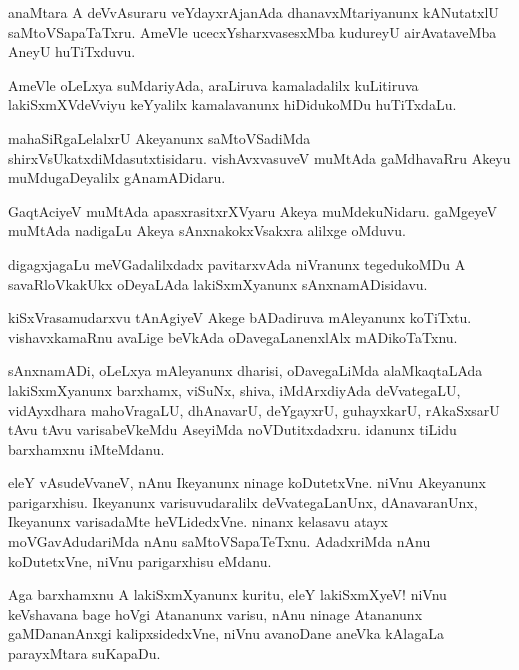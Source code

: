 \documentclass{article}
\begin{document}
\begin{mn}
anaMtara A deVvAsuraru veYdayxrAjanAda dhanavxMtariyanunx kANutatxlU
saMtoVSapaTaTxru. AmeVle ucecxYsharxvasesxMba kudureyU airAvataveMba
AneyU huTiTxduvu.
\end{mn}

\begin{mn}
AmeVle oLeLxya suMdariyAda, araLiruva kamaladalilx kuLitiruva
lakiSxmXVdeVviyu keYyalilx kamalavanunx hiDidukoMDu huTiTxdaLu.
\end{mn}

\begin{mn}
mahaSiRgaLelalxrU Akeyanunx saMtoVSadiMda
shirxVsUkatxdiMdasutxtisidaru. vishAvxvasuveV muMtAda gaMdhavaRru
Akeyu muMdugaDeyalilx gAnamADidaru.
\end{mn}

\begin{mn}
GaqtAciyeV muMtAda apasxrasitxrXVyaru Akeya muMdekuNidaru. gaMgeyeV
muMtAda nadigaLu Akeya sAnxnakokxVsakxra alilxge oMduvu.
\end{mn}

\begin{mn}%
digagxjagaLu meVGadalilxdadx pavitarxvAda niVranunx tegedukoMDu A
savaRloVkakUkx oDeyaLAda lakiSxmXyanunx sAnxnamADisidavu.
\end{mn}

\begin{mn}
kiSxVrasamudarxvu tAnAgiyeV Akege bADadiruva mAleyanunx
koTiTxtu. vishavxkamaRnu avaLige beVkAda oDavegaLanenxlAlx mADikoTaTxnu.
\end{mn}

\begin{mn}%
sAnxnamADi, oLeLxya mAleyanunx dharisi, oDavegaLiMda alaMkaqtaLAda
lakiSxmXyanunx barxhamx, viSuNx, shiva, iMdArxdiyAda deVvategaLU,
vidAyxdhara mahoVragaLU, dhAnavarU, deYgayxrU, guhayxkarU, rAkaSxsarU
tAvu tAvu varisabeVkeMdu AseyiMda noVDutitxdadxru. idanunx tiLidu
barxhamxnu iMteMdanu.
\end{mn}

\begin{mn}%
eleY vAsudeVvaneV, nAnu Ikeyanunx ninage koDutetxVne. niVnu Akeyanunx
parigarxhisu. Ikeyanunx varisuvudaralilx deVvategaLanUnx,
dAnavaranUnx, Ikeyanunx varisadaMte heVLidedxVne. ninanx kelasavu
atayx moVGavAdudariMda nAnu saMtoVSapaTeTxnu. AdadxriMda nAnu
koDutetxVne, niVnu parigarxhisu eMdanu.
\end{mn}

\begin{mn}%
Aga barxhamxnu A lakiSxmXyanunx kuritu, eleY lakiSxmXyeV! niVnu
keVshavana bage hoVgi Atananunx varisu, nAnu ninage Atananunx
gaMDananAnxgi kalipxsidedxVne, niVnu avanoDane aneVka kAlagaLa
parayxMtara suKapaDu.
\end{mn}
\end{document}
